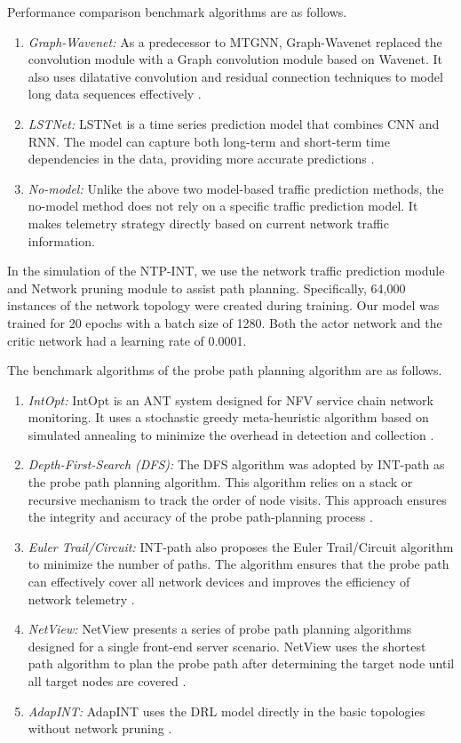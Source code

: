 \documentclass[journal]{IEEEtran}
\begin{document}
Performance comparison benchmark algorithms are as follows.

\begin{enumerate} 
\item \emph{Graph-Wavenet:} As a predecessor to MTGNN, Graph-Wavenet replaced the convolution module with a Graph convolution module based on Wavenet.   It also uses dilatative convolution and residual connection techniques to model long data sequences effectively \cite{39}.
\item \emph{LSTNet:} LSTNet is a time series prediction model that combines CNN and RNN. The model can capture both long-term and short-term time dependencies in the data, providing more accurate predictions \cite{40}.
\item \emph{No-model:} Unlike the above two model-based traffic prediction methods, the no-model method does not rely on a specific traffic prediction model. It makes telemetry strategy directly based on current network traffic information.
\end{enumerate} 

In the simulation of the NTP-INT, we use the network traffic prediction module and Network pruning module to assist path planning.
Specifically, 64,000 instances of the network topology were created during training. Our model was trained for 20 epochs with a batch size of 1280. Both the actor network and the critic network had a learning rate of 0.0001.

The benchmark algorithms of the probe path planning algorithm are as follows.

\begin{enumerate} 
\item \emph{IntOpt:} IntOpt is an ANT system designed for NFV service chain network monitoring. It uses a stochastic greedy meta-heuristic algorithm based on simulated annealing to minimize the overhead in detection and collection \cite{8}. 
\item \emph{Depth-First-Search (DFS):} The DFS algorithm was adopted by INT-path as the probe path planning algorithm. This algorithm relies on a stack or recursive mechanism to track the order of node visits.   This approach ensures the integrity and accuracy of the probe path-planning process \cite{12}.
\item \emph{Euler Trail/Circuit:} INT-path also proposes the Euler Trail/Circuit algorithm to minimize the number of paths. The algorithm ensures that the probe path can effectively cover all network devices and improves the efficiency of network telemetry \cite{12}. 
\item \emph{NetView:} NetView presents a series of probe path planning algorithms designed for a single front-end server scenario. NetView uses the shortest path algorithm to plan the probe path after determining the target node until all target nodes are covered \cite{13}.
\item \emph{AdapINT:} AdapINT uses the DRL model directly in the basic topologies without network pruning \cite{AdapINT}.
\end{enumerate} 
\end{document}
